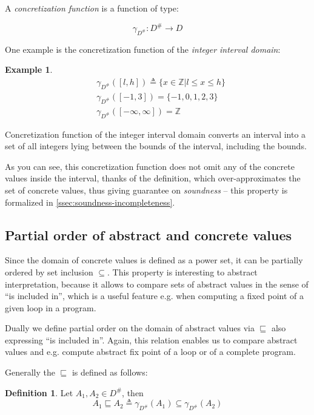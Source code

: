 \documentclass[12pt,oneside]{fithesis2}
\theoremstyle{definition}
\newtheorem{exmp}{Example}[section]
\newtheorem{definition}{Definition}
\begin{document}
A \textit{concretization function} is a function of type:

\[
\gamma_{D^\#}\colon D^\# \to D
\]

One example is the concretization function of the \textit{integer interval domain}:

\begin{exmp}
  \begin{align*}
    &\gamma_{D^\#}([l,h]) \triangleq \{x \in \mathbb Z | l \le x \le h\}\\
    &\gamma_{D^\#}([-1,3]) = \{-1, 0, 1, 2, 3\}\\
    &\gamma_{D^\#}([-\infty, \infty]) = \mathbb Z
  \end{align*}
\end{exmp}

Concretization function of the integer interval domain converts an interval into a set of all integers lying between the bounds of the interval, including the bounds.

As you can see, this concretization function does not omit any of the concrete values inside the interval, thanks of the definition, which over-approximates the set of concrete values, thus giving guarantee on \textit{soundness} -- this property is formalized in \ref{ssec:soundness-incompleteness}.

\subsection{Partial order of abstract and concrete values}

Since the domain of concrete values is defined as a power set, it can be partially ordered by set inclusion $\subseteq$. This property is interesting to abstract interpretation, because it allows to compare sets of abstract values in the sense of ``is included in'', which is a useful feature e.g. when computing a fixed point of a given loop in a program.

Dually we define partial order on the domain of abstract values via $\sqsubseteq$ also expressing ``is included in''. Again, this relation enables us to compare abstract values and e.g. compute abstract fix point of a loop or of a complete program.

Generally the $\sqsubseteq$ is defined as follows:

\begin{definition}
  Let $A_1, A_2 \in D^\#$, then
  \[
    A_1 \sqsubseteq A_2 \triangleq \gamma_{D^\#}(A_1) \subseteq \gamma_{D^\#}(A_2)
  \]
\end{definition}
\end{document}

